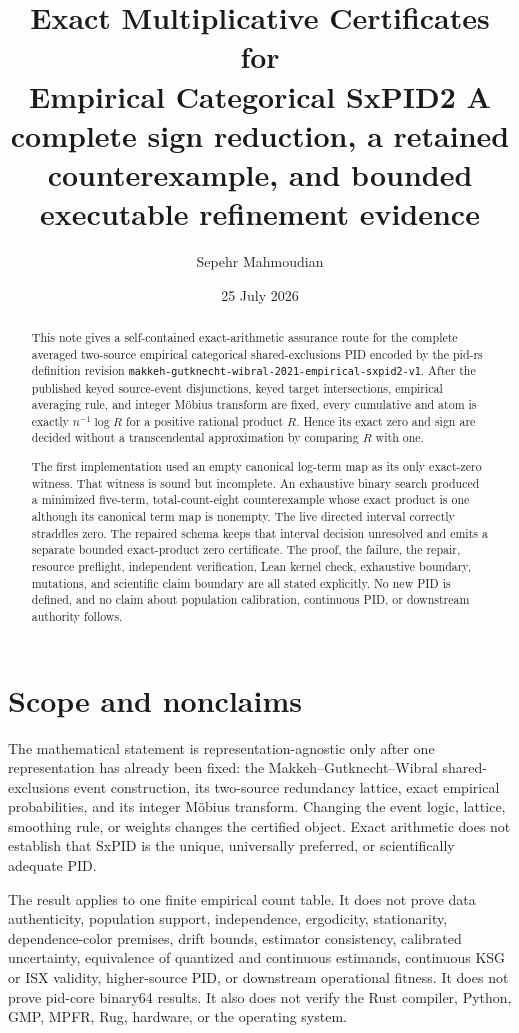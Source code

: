 \documentclass[11pt]{article}
\title{\PidReportTitle
  {Exact Multiplicative Certificates for\\Empirical Categorical SxPID2}
  {A complete sign reduction, a retained counterexample, and bounded\\
   executable refinement evidence}}
\author{Sepehr Mahmoudian}
\date{25 July 2026}
\theoremstyle{definition}
\begin{document}
\PidMakeTitle

\begin{abstract}
This note gives a self-contained exact-arithmetic assurance route for the complete averaged
two-source empirical categorical shared-exclusions PID encoded by the pid-rs definition revision
\texttt{makkeh-gutknecht-wibral-2021-empirical-sxpid2-v1}.  After the published keyed source-event
disjunctions, keyed target intersections, empirical averaging rule, and integer M\"obius transform
are fixed, every cumulative and atom is exactly \(n^{-1}\log R\) for a positive rational product
\(R\).  Hence its exact zero and sign are decided without a transcendental approximation by
comparing \(R\) with one.

The first implementation used an empty canonical log-term map as its only exact-zero witness.
That witness is sound but incomplete.  An exhaustive binary search produced a minimized
five-term, total-count-eight counterexample whose exact product is one although its canonical term
map is nonempty.  The live directed interval correctly straddles zero.  The repaired schema keeps
that interval decision unresolved and emits a separate bounded exact-product zero certificate.
The proof, the failure, the repair, resource preflight, independent verification, Lean kernel
check, exhaustive boundary, mutations, and scientific claim boundary are all stated explicitly.
No new PID is defined, and no claim about population calibration, continuous PID, or downstream
authority follows.
\end{abstract}

\tableofcontents

\section{Scope and nonclaims}

The mathematical statement is representation-agnostic only after one representation has already
been fixed: the Makkeh--Gutknecht--Wibral shared-exclusions event construction, its two-source
redundancy lattice, exact empirical probabilities, and its integer M\"obius transform.  Changing
the event logic, lattice, smoothing rule, or weights changes the certified object.  Exact
arithmetic does not establish that SxPID is the unique, universally preferred, or scientifically
adequate PID.

The result applies to one finite empirical count table.  It does not prove data authenticity,
population support, independence, ergodicity, stationarity, dependence-color premises, drift
bounds, estimator consistency, calibrated uncertainty, equivalence of quantized and continuous
estimands, continuous KSG or ISX validity, higher-source PID, or downstream operational fitness.
It does not prove pid-core binary64 results.  It also does not verify the Rust compiler, Python,
GMP, MPFR, Rug, hardware, or the operating system.
\end{document}
